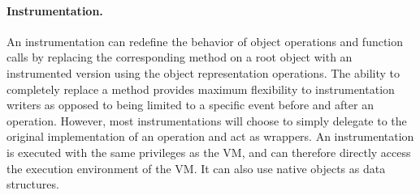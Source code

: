 \paragraph{Instrumentation.} An instrumentation can redefine the behavior of
object operations and function calls by replacing the corresponding method on a
root object with an instrumented version using the object representation
operations. The ability to completely replace a method provides maximum
flexibility to instrumentation writers as opposed to being limited to a
specific event before and after an operation. However, most instrumentations
will choose to simply delegate to the original implementation of an operation
and act as wrappers. An instrumentation is executed with the same privileges as
the VM, and can therefore directly access the execution environment of the VM.
It can also use native objects as data structures.

